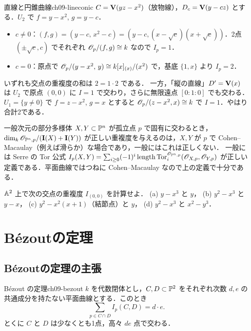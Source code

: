 \begin{myex}{直線と円錐曲線}{ch09-lineconic}
$C=\mathbf{V}(yz-x^2)$（放物線），$D_c=\mathbf{V}(y-cz)$ とする．$U_2$ で $f=y-x^2$, $g=y-c$．
\begin{itemize}
  \item $c\neq0$：$(f,g)=(y-c,\,x^2-c)=(y-c,(x-\sqrt c)(x+\sqrt c))$．2点 $(\pm\sqrt c,c)$ でそれぞれ $\mathscr{O}_p/(f,g)\cong k$ なので $I_p=1$．
  \item $c=0$：原点で $\mathscr{O}_{p}/(y-x^2,\,y)\cong k[x]_{(x)}/(x^2)$ で，基底 $\{1,x\}$ より $I_p=2$．
\end{itemize}
いずれも交点の重複度の和は $2=1\cdot2$ である．
一方，「縦の直線」$D'=\mathbf{V}(x)$ は $U_2$ で原点 $(0,0)$ に $I=1$ で交わり，さらに無限遠点 $[0:1:0]$ でも交わる．$U_1=\{y\neq0\}$ で $f=z-x^2$, $g=x$ とすると $\mathscr{O}_p/(z-x^2,x)\cong k$ で $I=1$．やはり合計2である．
\end{myex}

\begin{note}
一般次元の部分多様体 $X,Y\subset\mathbb{P}^n$ が孤立点 $p$ で固有に交わるとき，$\dim_k\mathscr{O}_{\mathbb{P}^n,p}/(\mathbf{I}(X)+\mathbf{I}(Y))$ が正しい重複度を与えるのは，$X,Y$ が $p$ で Cohen--Macaulay（例えば滑らか）な場合であり，一般にはこれは正しくない．
一般には Serre の Tor 公式
$I_p(X,Y)=\sum_{i\ge0}(-1)^i\,\mathrm{length}\,\mathrm{Tor}_i^{\mathscr{O}_{\mathbb{P}^n,p}}(\mathscr{O}_{X,p},\mathscr{O}_{Y,p})$
が正しい定義である．平面曲線ではつねに Cohen--Macaulay なので上の定義で十分である．
\end{note}

$\mathbb{A}^2$ 上で次の交点の重複度 $I_{(0,0)}$ を計算せよ．
(a) $y-x^3$ と $y$，\quad
(b) $y^2-x^3$ と $y-x$，\quad
(c) $y^2-x^2(x+1)$（結節点）と $y$，\quad
(d) $y^2-x^3$ と $x^2-y^3$．

\section{B\'ezoutの定理}

\subsection{B\'ezoutの定理の主張}

\begin{mythm}{B\'ezout の定理}{ch09-bezout}
$k$ を代数閉体とし，$C,D\subset\mathbb{P}^2$ をそれぞれ次数 $d,e$ の共通成分を持たない平面曲線とする．このとき
\[
  \sum_{p\in C\cap D}I_p(C,D)=d\cdot e.
\]
とくに $C$ と $D$ は少なくとも1点，高々 $de$ 点で交わる．
\end{mythm}

